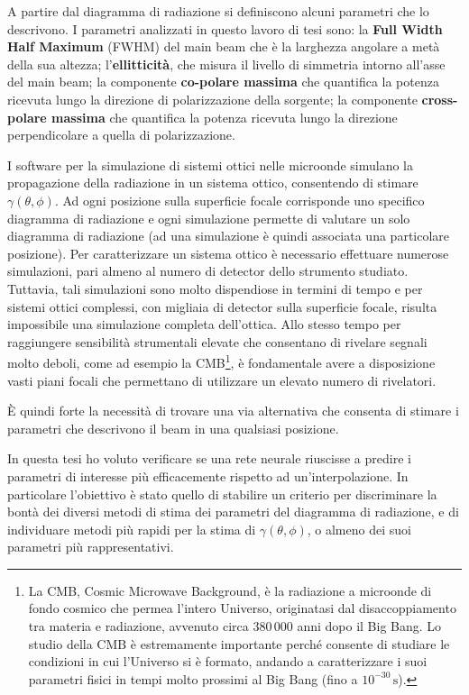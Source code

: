 \documentclass[12pt,a4paper,final]{report}			%
\begin{document}

A partire dal diagramma di radiazione si definiscono alcuni parametri che lo descrivono. I parametri analizzati in questo lavoro di tesi sono: la \textbf{Full Width Half Maximum} (FWHM) del main beam che è la larghezza angolare a metà della sua altezza; l'\textbf{ellitticità}, che misura il livello di simmetria intorno all'asse del main beam; la componente \textbf{co-polare massima} che quantifica la potenza ricevuta lungo la direzione di polarizzazione della sorgente; la componente \textbf{cross-polare massima} che quantifica la potenza ricevuta lungo la direzione perpendicolare a quella di polarizzazione.


I software per la simulazione di sistemi ottici nelle microonde simulano la propagazione della radiazione in un sistema ottico, consentendo di stimare $\gamma(\theta, \phi)$.
Ad ogni posizione sulla superficie focale corrisponde uno specifico diagramma di radiazione e ogni simulazione permette di valutare un solo diagramma di radiazione (ad una simulazione è quindi associata una particolare posizione). Per caratterizzare un sistema ottico è necessario effettuare numerose simulazioni, pari almeno al numero di detector dello strumento studiato. 
Tuttavia, tali simulazioni sono molto dispendiose in termini di tempo e per sistemi ottici complessi, con migliaia di detector sulla superficie focale, risulta impossibile una simulazione completa dell'ottica.
Allo stesso tempo per raggiungere sensibilità strumentali elevate che consentano di rivelare segnali molto deboli, come ad esempio la CMB\footnote{La CMB, Cosmic Microwave Background, \`e la radiazione a microonde di fondo cosmico che permea l’intero Universo, originatasi dal disaccoppiamento tra materia e radiazione, avvenuto circa 380\,000 anni dopo il Big Bang. Lo studio della CMB è estremamente importante perché consente di studiare le condizioni in cui l'Universo si è formato, andando a caratterizzare i suoi parametri fisici in tempi molto prossimi al Big Bang (fino a $10^{-30}\,\text{s}$).}, è fondamentale avere a disposizione vasti piani focali che permettano di utilizzare un elevato numero di rivelatori.

\`E quindi forte la necessità di trovare una via alternativa che consenta di stimare i parametri che descrivono il beam in una qualsiasi posizione.

In questa tesi ho voluto verificare se una rete neurale riuscisse a predire i parametri di interesse più efficacemente rispetto ad un'interpolazione. In particolare l'obiettivo è stato quello di stabilire un criterio per discriminare la bontà dei diversi metodi di stima dei parametri del diagramma di radiazione, e di individuare metodi più rapidi per la stima di $\gamma(\theta, \phi)$, o almeno dei suoi parametri più rappresentativi.
\end{document}
